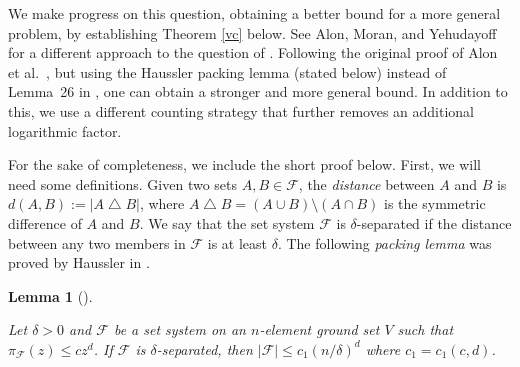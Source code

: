 \documentclass[11pt]{article}
\theoremstyle{plain}
\newtheorem{theorem}{Theorem}[section]
\newtheorem{lemma}[theorem]{Lemma}
\theoremstyle{definition}
\theoremstyle{remark}
\begin{document}
We make progress on this question, obtaining a better bound for a more general problem, by establishing Theorem \ref{vc} below. See Alon, Moran, and Yehudayoff \cite{alon2} for a different approach to the question of \cite{alon}. Following the original proof of Alon et al.~\cite{alon}, but using the Haussler packing lemma \cite{H} (stated below) instead of Lemma~26 in \cite{alon}, one can obtain a stronger and more general bound. In addition to this, we use a different counting strategy that further removes an additional logarithmic factor. 

 




For the sake of completeness, we include the short proof below.  First, we will need some definitions. Given two sets $A,B \in \mathcal{F}$, the \emph{distance} between $A$ and $B$ is $d(A,B):=|A\bigtriangleup  B|$, where $A \bigtriangleup B = (A\cup B)\setminus (A\cap B)$ is the symmetric difference of $A$ and $B$.  We say that the set system $\mathcal{F}$ is $\delta$-separated if the distance between any two members in $\mathcal{F}$ is at least $\delta$.  The following \emph{packing lemma} was proved by Haussler in \cite{H}.




\begin{lemma}[\cite{H}]\label{haussler}

Let $\delta > 0$ and $\mathcal{F}$ be a set system on an $n$-element ground set $V$ such that $\pi_{\mathcal{F}}(z) \leq cz^d$.   If $\mathcal{F}$ is $\delta$-separated, then $|\mathcal{F}| \leq c_1(n/\delta)^{d}$ where $c_1= c_1(c,d)$.

\end{lemma}


\medskip
\end{document}
